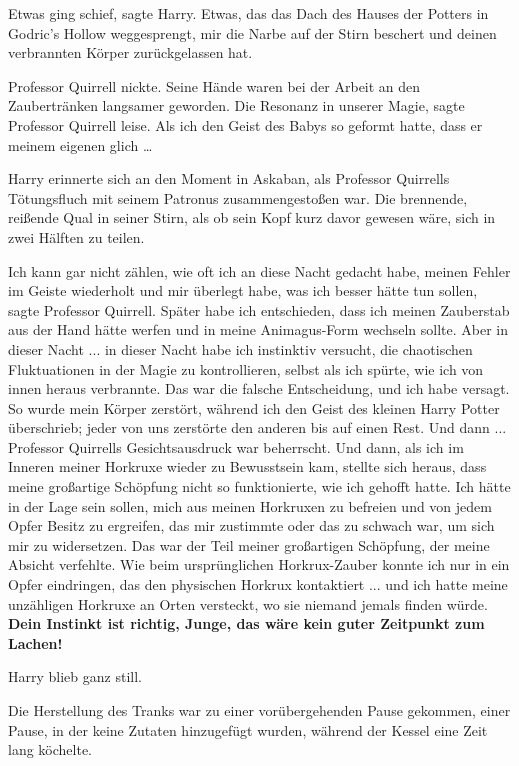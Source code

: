 Etwas ging schief\grqq{}, sagte Harry. \glqq{}Etwas, das das Dach des Hauses der
Potters in Godric's Hollow weggesprengt, mir die Narbe auf der Stirn beschert
und deinen verbrannten Körper zurückgelassen hat.\grqq{}

Professor Quirrell nickte. Seine Hände waren bei der Arbeit an den Zaubertränken
langsamer geworden. \glqq{}Die Resonanz in unserer Magie\grqq{}, sagte Professor
Quirrell leise. \glqq{}Als ich den Geist des Babys so geformt hatte, dass er
meinem eigenen glich …\grqq{}

Harry erinnerte sich an den Moment in Askaban, als Professor Quirrells
Tötungsfluch mit seinem Patronus zusammengestoßen war. Die brennende, reißende
Qual in seiner Stirn, als ob sein Kopf kurz davor gewesen wäre, sich in zwei
Hälften zu teilen.

\glqq{}Ich kann gar nicht zählen, wie oft ich an diese Nacht gedacht habe, meinen
Fehler im Geiste wiederholt und mir überlegt habe, was ich besser hätte tun
sollen\grqq{}, sagte Professor Quirrell. \glqq{}Später habe ich entschieden, dass
ich meinen Zauberstab aus der Hand hätte werfen und in meine Animagus-Form
wechseln sollte. Aber in dieser Nacht ... in dieser Nacht habe ich instinktiv
versucht, die chaotischen Fluktuationen in der Magie zu kontrollieren, selbst
als ich spürte, wie ich von innen heraus verbrannte. Das war die falsche
Entscheidung, und ich habe versagt. So wurde mein Körper zerstört, während ich
den Geist des kleinen Harry Potter überschrieb; jeder von uns zerstörte den
anderen bis auf einen Rest. Und dann ...\grqq{} Professor Quirrells Gesichtsausdruck
war beherrscht. \glqq{}Und dann, als ich im Inneren meiner Horkruxe wieder zu
Bewusstsein kam, stellte sich heraus, dass meine großartige Schöpfung nicht so
funktionierte, wie ich gehofft hatte. Ich hätte in der Lage sein sollen, mich
aus meinen Horkruxen zu befreien und von jedem Opfer Besitz zu ergreifen, das
mir zustimmte oder das zu schwach war, um sich mir zu widersetzen. Das war der
Teil meiner großartigen Schöpfung, der meine Absicht verfehlte. Wie beim
ursprünglichen Horkrux-Zauber konnte ich nur in ein Opfer eindringen, das den
physischen Horkrux kontaktiert ... und ich hatte meine unzähligen Horkruxe an
Orten versteckt, wo sie niemand jemals finden würde. \textbf{Dein Instinkt ist
richtig, Junge, das wäre kein guter Zeitpunkt zum Lachen!}\grqq{}

Harry blieb ganz still.

Die Herstellung des Tranks war zu einer vorübergehenden Pause gekommen, einer
Pause, in der keine Zutaten hinzugefügt wurden, während der Kessel eine Zeit
lang köchelte.

